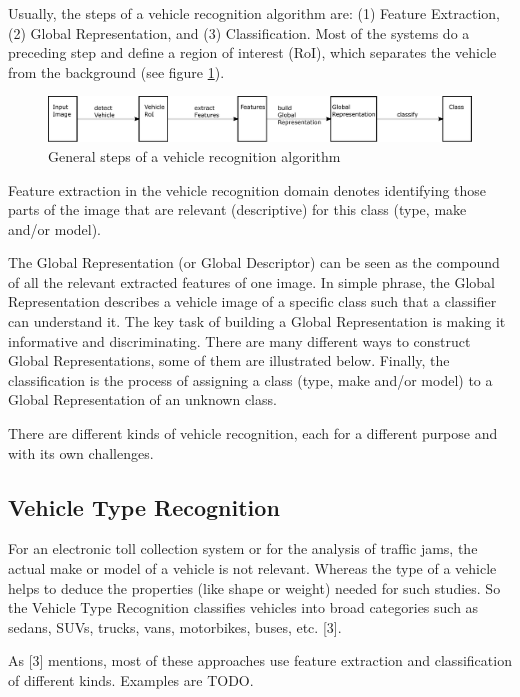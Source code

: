 Usually, the steps of a vehicle recognition algorithm are: (1) Feature Extraction, (2) Global Representation, and (3) Classification. Most of the systems do a preceding step and define a region of interest (RoI), which separates the vehicle from the background (see figure \ref{fig:vrSteps}).

\begin{figure}[bth]
  \centering
        \includegraphics[width=.95\linewidth]{gfx/vr_steps}
        \caption{General steps of a vehicle recognition algorithm}
        \label{fig:vrSteps}
\end{figure}

Feature extraction in the vehicle recognition domain denotes identifying those parts of the image that are relevant (descriptive) for this class (type, make and/or model).

The Global Representation (or Global Descriptor) can be seen as the compound of all the relevant extracted features of one image. In simple phrase, the Global Representation describes a vehicle image of a specific class such that a classifier can understand it. The key task of building a Global Representation is making it informative and discriminating. There are many different ways to construct Global Representations, some of them are illustrated below.
Finally, the classification is the process of assigning a class (type, make and/or model) to a Global Representation of an unknown class.

There are different kinds of vehicle recognition, each for a different purpose and with its own challenges.

\subsection{Vehicle Type Recognition}
For an electronic toll collection system or for the analysis of traffic jams, the actual make or model of a vehicle is not relevant. Whereas the type of a vehicle helps to deduce the properties (like shape or weight) needed for such studies. So the Vehicle Type Recognition classifies vehicles into broad categories such as sedans, SUVs, trucks, vans, motorbikes, buses, etc. [3].

As [3] mentions, most of these approaches use feature extraction and classification of different kinds. Examples are TODO.

